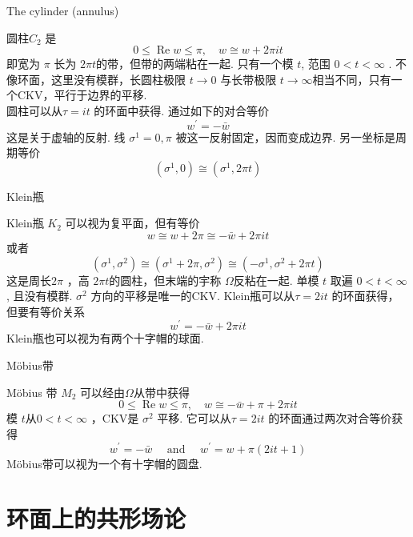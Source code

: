 \centerline{\Large The cylinder (annulus)}
圆柱$C_{2}$ 是
\begin{equation}
	0 \leq \operatorname{Re} w \leq \pi, \quad w \cong w+2 \pi i t
\end{equation}
即宽为 $\pi$ 长为 $2 \pi t$的带，但带的两端粘在一起. 只有一个模 $t$, 范围 $0<t<\infty $ . 不像环面，这里没有模群，长圆柱极限 $t \rightarrow 0$ 与长带极限 $t \rightarrow \infty$相当不同，只有一个CKV，平行于边界的平移. \\
圆柱可以从$\tau=i t$ 的环面中获得. 通过如下的对合等价
\begin{equation}
	w^{\prime}=-\bar{w}
\end{equation}
这是关于虚轴的反射. 线 $\sigma^{1}=0, \pi$ 被这一反射固定，因而变成边界. 另一坐标是周期等价
\begin{equation}
	\left(\sigma^{1}, 0\right) \cong\left(\sigma^{1}, 2 \pi t\right)
\end{equation}

\centerline{\Large Klein瓶}
Klein瓶 $K_{2}$ 可以视为复平面，但有等价
\begin{equation}
	w \cong w+2 \pi \cong-\bar{w}+2 \pi i t
\end{equation}
或者
\begin{equation}
	\left(\sigma^{1}, \sigma^{2}\right) \cong\left(\sigma^{1}+2 \pi, \sigma^{2}\right) \cong\left(-\sigma^{1}, \sigma^{2}+2 \pi t\right)
\end{equation}
这是周长$2 \pi$ ，高 $2 \pi t$的圆柱，但末端的宇称 $\Omega $反粘在一起.  单模 $t$ 取遍 $0<t<\infty$, 且没有模群.  $\sigma^{2}$ 方向的平移是唯一的CKV. Klein瓶可以从$\tau=2 i t$ 的环面获得，但要有等价关系
\begin{equation}
	w^{\prime}=-\bar{w}+2 \pi i t
\end{equation}
Klein瓶也可以视为有两个十字帽的球面.\\

\centerline{\Large Möbius带}
Möbius 带 $M_{2}$ 可以经由$\Omega$从带中获得
\begin{equation}
	0 \leq \operatorname{Re} w \leq \pi, \quad w \cong-\bar{w}+\pi+2 \pi i t
\end{equation}
模 $t$从$0<t<\infty$ ，CKV是 $\sigma^{2}$ 平移. 它可以从$\tau=2 i t$ 的环面通过两次对合等价获得
\begin{equation}
	w^{\prime}=-\bar{w} \quad \text { and } \quad w^{\prime}=w+\pi(2 i t+1)
\end{equation}
Möbius带可以视为一个有十字帽的圆盘.\\

\section{环面上的共形场论}%

